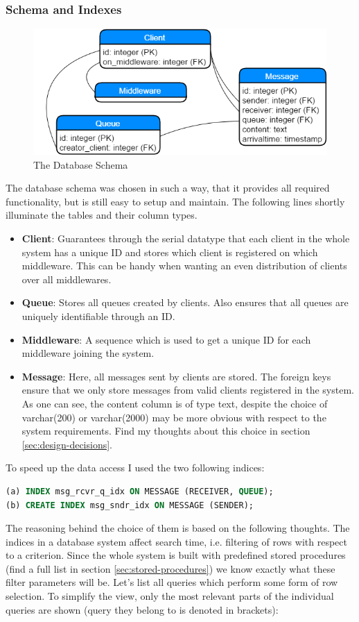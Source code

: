 \documentclass[11pt]{article}
\begin{document}
\subsubsection{Schema and Indexes}\label{sec:schema-and-indexes}
\begin{figure}[!ht]
\centering
\includegraphics[width=0.7\linewidth]{figures/database/db_schema}
\caption{The Database Schema}
\label{fig:db_schema}
\end{figure}
The database schema was chosen in such a way, that it provides all required functionality, but is still easy to setup and maintain. The following lines shortly illuminate the tables and their column types.
\begin{itemize}
	\item \textbf{Client}: Guarantees through the serial datatype that each client in the whole system has a unique ID and stores which client is registered on which middleware. This can be handy when wanting an even distribution of clients over all middlewares.
	\item \textbf{Queue}: Stores all queues created by clients. Also ensures that all queues are uniquely identifiable through an ID.
	\item \textbf{Middleware}: A sequence which is used to get a unique ID for each middleware joining the system.
	\item \textbf{Message}: Here, all messages sent by clients are stored. The foreign keys ensure that we only store messages from valid clients registered in the system. As one can see, the content column is of type text, despite the choice of varchar(200) or varchar(2000) may be more obvious with respect to the system requirements. Find my thoughts about this choice in section \ref{sec:design-decisions}.
\end{itemize}
To speed up the data access I used the two following indices:
\begin{lstlisting}[language=SQL,basicstyle=\small]
(a) INDEX msg_rcvr_q_idx ON MESSAGE (RECEIVER, QUEUE);
(b) CREATE INDEX msg_sndr_idx ON MESSAGE (SENDER);
\end{lstlisting}
The reasoning behind the choice of them is based on the following thoughts. The indices in a database system affect search time, i.e. filtering of rows with respect to a criterion. Since the whole system is built with predefined stored procedures (find a full list in section \ref{sec:stored-procedures}) we know exactly what these filter parameters will be. Let's list all queries which perform some form of row selection. To simplify the view, only the most relevant parts of the individual queries are shown (query they belong to is denoted in brackets):
\end{document}
